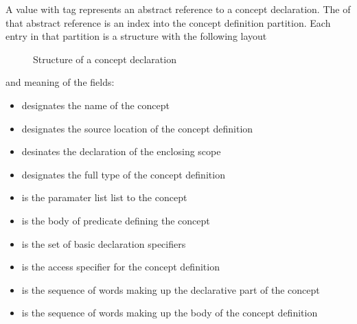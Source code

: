 A  value with tag  represents an abstract reference
to a concept declaration.  The  of that abstract reference is an index into the concept
definition partition.  Each entry in that partition is a structure with the following layout
%
\begin{figure}[H]
	\centering
	\caption{Structure of a concept declaration}
	\label{fig:ifc-concept-decl-structure}
\end{figure}
%
and meaning of the fields:
\begin{itemize}
	\item {} designates the name of the concept
	\item {} designates the source location of the concept definition
	\item {} desinates the declaration of the enclosing scope
	\item {} designates the full type of the concept definition
	\item {} is the paramater list list to the concept
	\item {} is the body of predicate defining the concept
	\item {} is the set of basic declaration specifiers
	\item {} is the access specifier for the concept definition
	\item {} is the sequence of words making up the declarative part of the concept
	\item {} is the sequence of words making up the body of the concept definition
\end{itemize}

